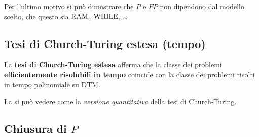 Per l'ultimo motivo si può dimostrare che $P$ e $FP$ non dipendono dal modello scelto, che questo sia $\text{RAM}$, $\text{WHILE}$, \dots

\subsection{Tesi di Church-Turing estesa (tempo)}

La \textbf{tesi di Church-Turing estesa} afferma che la classe dei problemi \textbf{efficientemente risolubili in tempo} coincide con la classe dei problemi risolti in tempo polinomiale su DTM.

La si può vedere come la \textit{versione quantitativa} della tesi di Church-Turing. 

\subsection{Chiusura di $P$}

